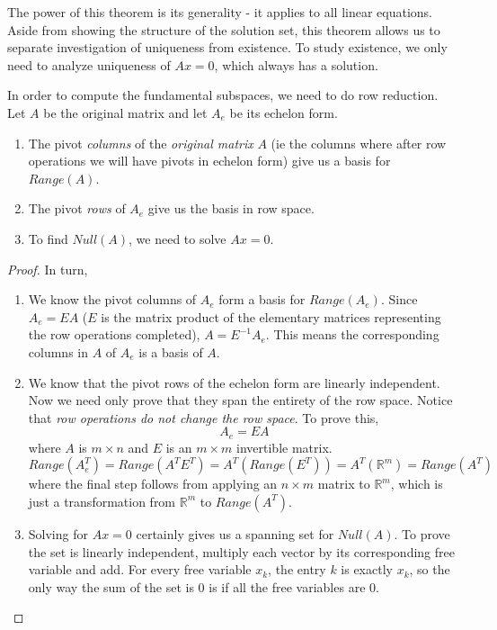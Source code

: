 The power of this theorem is its generality - it applies to all linear equations. Aside from showing the structure of the solution set, this theorem allows us to separate investigation of uniqueness from existence. To study existence, we only need to analyze uniqueness of $Ax = 0$, which always has a solution. 

\begin{theorem}
In order to compute the fundamental subspaces, we need to do row reduction. Let $A$ be the original matrix and let $A_{e}$ be its echelon form. 
\begin{enumerate}
	\item The pivot \textit{columns} of the \textit{original matrix} $A$ (ie the columns where after row operations we will have pivots in echelon form) give us a basis for $Range(A)$. 
	\item The pivot \textit{rows} of $A_{e}$ give us the basis in row space. 
	\item To find $Null(A)$, we need to solve $Ax = 0$. 
\end{enumerate}
\end{theorem}

\begin{proof}
In turn, 
\begin{enumerate}
	\item We know the pivot columns of $A_{e}$ form a basis for $Range(A_{e})$. Since $A_{e} = EA$ ($E$ is the matrix product of the elementary matrices representing the row operations completed), $A = E^{-1}A_{e}$. This means the corresponding columns in $A$ of $A_{e}$ is a basis of $A$. 
	
	\item We know that the pivot rows of the echelon form are linearly independent. Now we need only prove that they span the entirety of the row space. Notice that \textit{row operations do not change the row space}. To prove this, 
	$$A_{e} = EA$$
	where $A$ is $m \times n$ and $E$ is an $m \times m$ invertible matrix. 
	$$Range(A_{e}^{T}) = Range(A^{T} E^{T}) = A^{T} (Range(E^{T})) = A^{T} (\mathbb{R}^{m}) = Range(A^{T})$$
	where the final step follows from applying an $n \times m$ matrix to $\mathbb{R}^{m}$, which is just a transformation from $\mathbb{R}^{m}$ to $Range(A^{T})$. 
	
	\item Solving for $Ax = 0$ certainly gives us a spanning set for  $Null(A)$. To prove the set is linearly independent, multiply each vector by its corresponding free variable and add. For every free variable $x_{k}$, the entry $k$ is exactly $x_{k}$, so the only way the sum of the set is $0$ is if all the free variables are $0$. 
\end{enumerate}
\end{proof}

